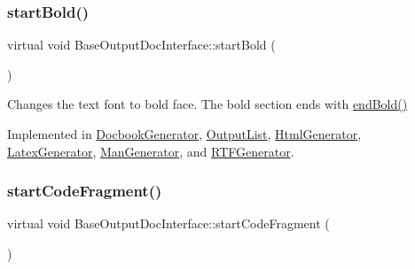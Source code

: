 \mbox{\label{class_base_output_doc_interface_aa0bfe5ef08077a7191ba4666f47c441b}} 
\subsubsection{\texorpdfstring{startBold()}{startBold()}}
{\footnotesize\ttfamily virtual void Base\+Output\+Doc\+Interface\+::start\+Bold (\begin{DoxyParamCaption}{ }\end{DoxyParamCaption})\hspace{0.3cm}{\ttfamily [pure virtual]}}

Changes the text font to bold face. The bold section ends with \mbox{\hyperlink{class_base_output_doc_interface_a2a17911ba778f8efac83999fb5d190d9}{end\+Bold()}} 

Implemented in \mbox{\hyperlink{class_docbook_generator_ad1704a02ae2ba6ab019e0c6e570ce218}{Docbook\+Generator}}, \mbox{\hyperlink{class_output_list_a796018ee85949771252f36fea9a288d0}{Output\+List}}, \mbox{\hyperlink{class_html_generator_a4785d0f1ac1828284aa1f21dbb1e3773}{Html\+Generator}}, \mbox{\hyperlink{class_latex_generator_a48859c667b43515483f4adb04f46cf0e}{Latex\+Generator}}, \mbox{\hyperlink{class_man_generator_a93a20331a8e073df653ed1df9834361b}{Man\+Generator}}, and \mbox{\hyperlink{class_r_t_f_generator_acb774060df0aaad9be8f91018503b20b}{R\+T\+F\+Generator}}.

\mbox{\label{class_base_output_doc_interface_ab19fc767b08c25b0ca7c976d24799bda}} 
\subsubsection{\texorpdfstring{startCodeFragment()}{startCodeFragment()}}
{\footnotesize\ttfamily virtual void Base\+Output\+Doc\+Interface\+::start\+Code\+Fragment (\begin{DoxyParamCaption}{ }\end{DoxyParamCaption})\hspace{0.3cm}{\ttfamily [pure virtual]}}

